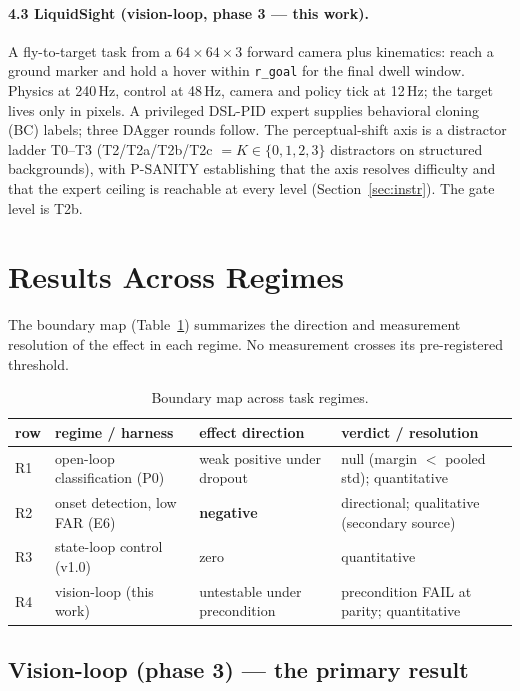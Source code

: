 \documentclass[11pt]{article}
\begin{document}
\paragraph{4.3 LiquidSight (vision-loop, phase 3 --- this work).} A fly-to-target task from a $64\times64\times3$ forward camera plus kinematics: reach a ground marker and hold a hover within \texttt{r\_goal} for the final dwell window. Physics at 240\,Hz, control at 48\,Hz, camera and policy tick at 12\,Hz; the target lives only in pixels. A privileged DSL-PID expert supplies behavioral cloning (BC) labels; three DAgger rounds follow. The perceptual-shift axis is a distractor ladder T0--T3 (T2/T2a/T2b/T2c $= K\in\{0,1,2,3\}$ distractors on structured backgrounds), with P-SANITY establishing that the axis resolves difficulty and that the expert ceiling is reachable at every level (Section~\ref{sec:instr}). The gate level is T2b.

\section{Results Across Regimes}\label{sec:results}
The boundary map (Table~\ref{tab:map}) summarizes the direction and measurement resolution of the effect in each regime. No measurement crosses its pre-registered threshold.

\begin{table}[h]
\centering
\small
\caption{Boundary map across task regimes.}\label{tab:map}
\begin{tabular}{llll}
\toprule
row & regime / harness & effect direction & verdict / resolution \\
\midrule
R1 & open-loop classification (P0) & weak positive under dropout & null (margin $<$ pooled std); quantitative \\
R2 & onset detection, low FAR (E6) & \textbf{negative} & directional; qualitative (secondary source) \\
R3 & state-loop control (v1.0) & zero & quantitative \\
R4 & vision-loop (this work) & untestable under precondition & precondition FAIL at parity; quantitative \\
\bottomrule
\end{tabular}
\end{table}

\subsection{Vision-loop (phase 3) --- the primary result}
\end{document}
